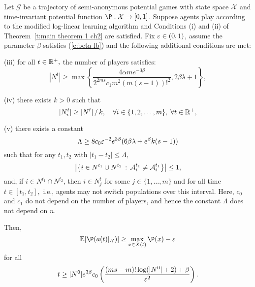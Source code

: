 \begin{Theorem}\label{t:main theorem 2 ch2}
Let $\mathcal{G}$ be a trajectory of semi-anonymous potential games with state space ${\mathcal X}$ and time-invariant potential function $\P:\X\to [0,1]$.
Suppose agents play according to the modified log-linear learning algorithm and Conditions (i) and (ii) of Theorem~\ref{t:main theorem 1 ch2} are satisfied. Fix $\varepsilon\in (0,1)$, assume the parameter $\beta$ satisfies (\ref{e:beta lb}) and the following additional conditions are met:

\noindent(iii) for all $t\in \mathbb{R}^+,$ the number of players satisfies: 
\begin{equation}\label{e:num players}
|N^t| \geq \max\left\{\frac{4\alpha m e^{-3\beta}}{2^{2ms}c_1m^2(m(s-1))!^2},2\beta\lambda+1   \right\},
\end{equation}


\noindent(iv) there exists $k>0$ such that
\begin{equation}\label{e:pop sizes}
|N_i^t| \geq |N^t|\mathop{/} k,\quad \forall i\in \{1,2,\ldots,m\},\;\forall t\in\mathbb{R}^+,
\end{equation}

\smallskip

\noindent (v) there exists a constant
\begin{equation}\label{e:lambda}
\Lambda\geq 8c_0\eps^{-2}e^{3\beta}(6\beta\lambda+e^\beta k(s-1))
%
\end{equation}
such that for any $t_1,t_2$ with $|t_1 - t_2|\leq \Lambda,$
\begin{equation}
\left|\left\{i\in N^{t_1} \cup N^{t_2} \,:\, \mathcal{A}_i^{t_1}\neq \mathcal{A}_i^{t_1}\right\}\right|\leq 1,
\end{equation}
and, if $ i \in N^{t_1} \cap N^{t_2}$, then $ i \in N_j^t$ for some $j \in \{1, \dots, m\}$ and for all time $t \in [t_1, t_2],$ i.e., agents may not switch populations over this interval.
%
Here, $c_0$ and $c_1$ do not depend on the number of players, and hence the constant $\Lambda$ does not depend on $n$.
%
%
\smallskip

\noindent Then,
\begin{equation}\label{e:expot}
\E[\P(a(t)|_{\X})]\geq \max_{x\in X(t)}\P(x) - \eps
\end{equation}
for all 
\begin{equation}\label{e:t ub}
t\geq |N^0| e^{3\beta}c_0\left({(ms-m)!\log(|N^0|+2)+\beta\over\varepsilon^2}\right).
\end{equation}
\end{Theorem}

